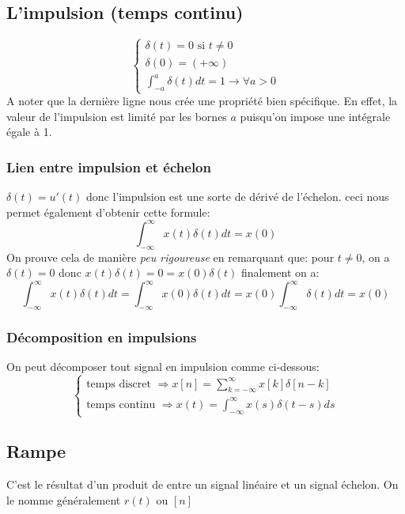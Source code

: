 \documentclass{report}
\begin{document}
\subsection{L'impulsion (temps continu)}
\begin{equation}
\begin{cases}
\delta (t) = 0 \text{ si } t \neq 0\\
\delta (0) = (+\infty)\\
\int_{-a}^a \delta (t) dt = 1 \rightarrow \forall a > 0
\end{cases}
\end{equation}
A noter que la dernière ligne nous crée une propriété bien spécifique. En effet, la valeur de l'impulsion est limité par les bornes $a$ puisqu'on impose une intégrale égale à 1.

\subsubsection{Lien entre impulsion et échelon}
$\delta (t) = u'(t)$ donc l'impulsion est une sorte de dérivé de l'échelon. ceci nous permet également d'obtenir cette formule:
\begin{equation}
\int_{-\infty}^{\infty} x(t) \delta(t)dt = x(0)
\end{equation}
On prouve cela de manière \textit{peu rigoureuse} en remarquant que: pour $t \neq 0$, on a $\delta(t) = 0$ donc $x(t)\delta(t) = 0 = x(0)\delta(t)$ finalement on a:
\begin{equation}
\int_{-\infty}^{\infty} x(t) \delta(t)dt = \int_{-\infty}^{\infty} x(0) \delta(t)dt = x(0) \int_{-\infty}^{\infty} \delta(t)dt = x(0)
\end{equation} 

\subsubsection{Décomposition en impulsions}
On peut décomposer tout signal en impulsion comme ci-dessous:
\begin{equation}
\begin{cases}
\text{temps discret } \Rightarrow x[n] = \sum_{k=-\infty}^{\infty}x[k]\delta[n-k] \\
\text{temps continu } \Rightarrow x(t) = \int_{-\infty}^{\infty} x(s) \delta(t-s)ds
\end{cases}
\end{equation}

\subsection{Rampe}
C'est le résultat d'un produit de entre un signal linéaire et un signal échelon. On le nomme généralement $r(t)$ ou $[n]$
\end{document}
